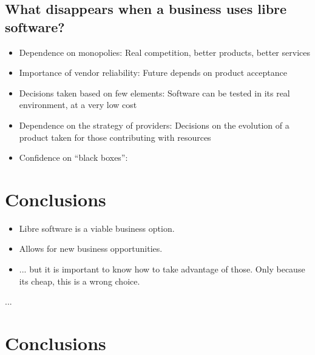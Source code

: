 \documentclass[11pt]{scrartcl}
\begin{document}
\subsection{What disappears when a business uses libre software?}

\begin{itemize}
    \item Dependence on monopolies: Real competition, better products, better services
    \item Importance of vendor reliability: Future depends on product acceptance
    \item Decisions taken based on few elements: Software can be tested in its real environment, at a very low cost
    \item Dependence on the strategy of providers: Decisions on the evolution of a product taken for those contributing with resources
    \item Confidence on “black boxes”:
\end{itemize}

\section{Conclusions}\label{lesson-3-conclusions}


\begin{itemize}
    \item Libre software is a viable business option.
    \item Allows for new business opportunities.
    \item ... but it is important to know how to take advantage of those. Only because its cheap, this is a wrong choice.
\end{itemize}

...

\section{Conclusions}\label{conclusions}
\end{document}
